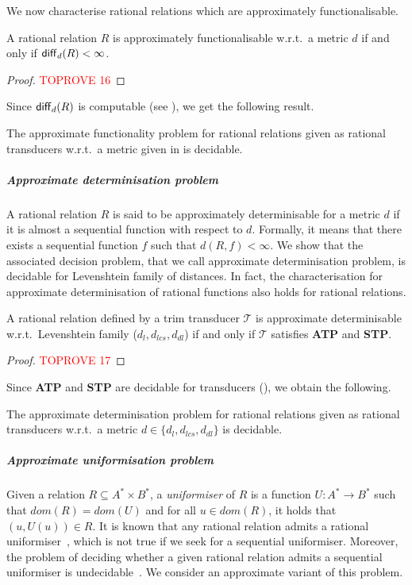 \documentclass[a4paper,UKenglish,cleveref, autoref, thm-restate,authorcolumns, colorlinks]{lipics-v2021}
\newcommand\dom{\mathit{dom}}
\newcommand\calT{\mathcal{T}}
\newcommand{\ATP}[0]{\textbf{ATP}}
\newcommand{\STP}[0]{\textbf{STP}}
\begin{document}
{We now characterise rational relations which are approximately functionalisable.

\begin{lemma}\label{lemma:approxfun}
   A rational relation $R$ is approximately functionalisable w.r.t.~a metric $d$ if and only if ${\sf diff}_d(R) < \infty$.
\end{lemma}

\begin{proof}\textcolor{red}{TOPROVE 16}\end{proof}

Since ${\sf diff}_d(R)$ is computable (see ), we get the following result.
\begin{theorem}
    The approximate functionality problem for rational relations given as rational transducers w.r.t.~a metric given in  is decidable.
\end{theorem}


\subparagraph*{Approximate determinisation problem}
A rational relation $R$ is said to be approximately determinisable for a metric $d$ if it is almost a sequential function with respect to $d$. Formally, it means that there exists a sequential function $f$ such that $d(R,f)<\infty$. We show that the associated decision problem, that we call approximate determinisation problem, is decidable for Levenshtein family of distances. In fact, the characterisation for approximate determinisation of rational functions also holds for rational relations. 
\begin{lemma}
    A rational relation defined by a trim transducer $\calT$ is approximate determinisable w.r.t.~Levenshtein family ($d_l,d_{lcs},d_{dl}$) if and only if $\calT$ satisfies \ATP{} and \STP{}.
\end{lemma}

\begin{proof}\textcolor{red}{TOPROVE 17}\end{proof}
Since \ATP{} and \STP{} are decidable for transducers (), we obtain the following.
\begin{theorem}
    The approximate determinisation problem for rational relations given as rational transducers w.r.t.~a metric $d \in \{d_l,d_{lcs},d_{dl}\}$ is decidable.
\end{theorem}
\subparagraph{Approximate uniformisation problem}

Given a relation $R\subseteq A^*\times B^*$, a \emph{uniformiser} of $R$ is a function $U : A^*\rightarrow B^*$ such that $\dom(R) = \dom(U)$ and 
for all $u\in\dom(R)$, it holds that $(u,U(u))\in R$. It is known that any rational relation admits a rational uniformiser~\cite{KOBAYASHI1969}, which is not true if we seek for a sequential uniformiser. Moreover, the problem of deciding whether a given rational relation admits a sequential uniformiser is undecidable~\cite{LoC}. We consider an approximate variant of this problem.

}
\end{document}
